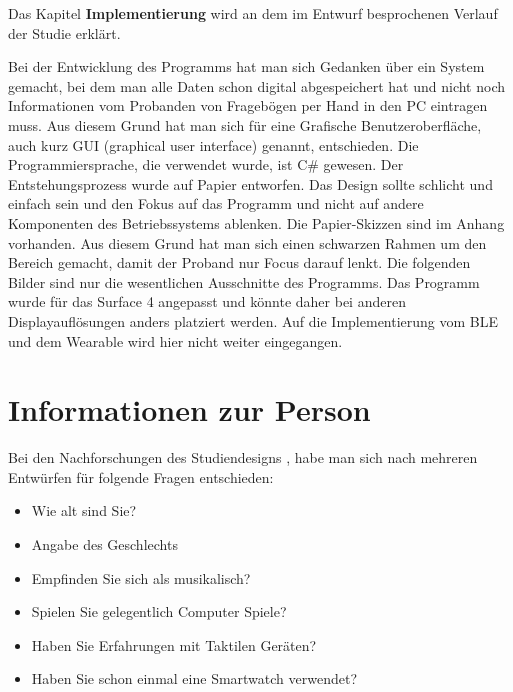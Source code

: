 
Das Kapitel \textbf{Implementierung} wird an dem im Entwurf besprochenen Verlauf der Studie erkl{\"a}rt.

Bei der Entwicklung des Programms hat man sich Gedanken {\"u}ber ein System gemacht, bei dem man alle Daten schon digital abgespeichert hat und nicht noch Informationen vom Probanden von Frageb{\"o}gen per Hand in den PC eintragen muss. Aus diesem Grund hat man sich f{\"u}r eine Grafische Benutzeroberfl{\"a}che, auch kurz GUI (graphical user interface) genannt, entschieden. 
Die Programmiersprache, die verwendet wurde, ist C\# gewesen.
Der Entstehungsprozess wurde auf Papier entworfen. Das Design sollte schlicht und einfach sein und den Fokus auf das Programm und nicht auf andere Komponenten des Betriebssystems ablenken. 
Die Papier-Skizzen sind im Anhang vorhanden. Aus diesem Grund hat man sich einen schwarzen Rahmen um den Bereich gemacht, damit der Proband nur Focus darauf lenkt. 
Die folgenden Bilder sind nur die wesentlichen Ausschnitte des Programms. 
Das Programm wurde f{\"u}r das Surface 4 angepasst und k{\"o}nnte daher bei anderen Displayaufl{\"o}sungen anders platziert werden. 
Auf die Implementierung vom BLE und dem Wearable wird hier nicht weiter eingegangen.

\section{Informationen zur Person}


Bei den Nachforschungen des Studiendesigns \cite{benyon2005designing}, habe man sich nach mehreren Entw{\"u}rfen f{\"u}r folgende Fragen entschieden:

\begin{itemize}
\item Wie alt sind Sie?
\item Angabe des Geschlechts
\item Empfinden Sie sich als musikalisch? 
\item Spielen Sie gelegentlich Computer Spiele?
\item Haben Sie Erfahrungen mit Taktilen Ger{\"a}ten?
\item Haben Sie schon einmal eine Smartwatch verwendet?
\end{itemize}

